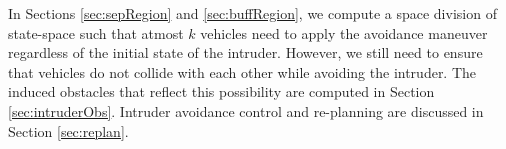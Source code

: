 In Sections \ref{sec:sepRegion} and \ref{sec:buffRegion}, we compute a space division of state-space such that atmost $k$ vehicles need to apply the avoidance maneuver regardless of the initial state of the intruder. However, we still need to ensure that vehicles do not collide with each other while avoiding the intruder. The induced obstacles that reflect this possibility are computed in Section \ref{sec:intruderObs}. Intruder avoidance control and re-planning are discussed in Section \ref{sec:replan}.